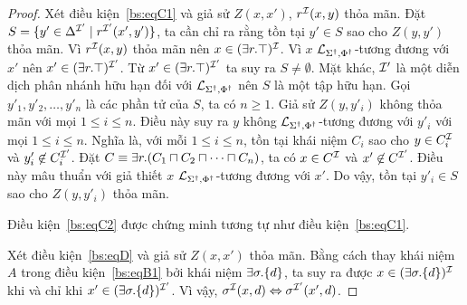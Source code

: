 \begin{proof}
	\semiItem Xét điều kiện~\eqref{bs:eqC1} và giả sử $Z(x,x')$, $r^{\mathcal{I}}(x,y)$ thỏa mãn. Đặt $S = \{y' \in \Delta^{\mathcal{I}'} \mid r^{\mathcal{I}'}(x',y')\}$, ta cần chỉ ra rằng tồn tại $y' \in S$ sao cho $Z(y,y')$ thỏa mãn. Vì $r^{\mathcal{I}}(x,y)$ thỏa mãn nên $x \in (\exists r.\top)^{\mathcal{I}}$. Vì $x$ $\mathcal{L}_{\Sigma^\dag,\Phi^\dag}$-tương đương với $x'$ nên $x' \in (\exists r.\top)^{\mathcal{I}'}$. Từ $x' \in (\exists r.\top)^{\mathcal{I}'}$ ta suy ra $S \not= \emptyset$. Mặt khác, $\mathcal{I}'$ là một diễn dịch phân nhánh hữu hạn đối với $\mathcal{L}_{\Sigma^\dag,\Phi^\dag}$ nên $S$ là một tập hữu hạn. Gọi $y'_1, y'_2, \ldots, y'_n$ là các phần tử của $S$, ta có $n \geq 1$.
	Giả sử $Z(y,y'_i)$ không thỏa mãn với mọi $1 \leq i \leq n$. Điều này suy ra $y$ không $\mathcal{L}_{\Sigma^\dag,\Phi^\dag}$-tương đương với $y'_i$ với mọi $1 \leq i \leq n$. Nghĩa là, với mỗi $1 \leq i \leq n$, tồn tại khái niệm $C_i$ sao cho $y \in C_i^{\mathcal{I}}$ và $y'_i \not\in C_i^{\mathcal{I}'}$. Đặt $C \equiv \exists r.(C_1 \sqcap C_2 \sqcap \cdots \sqcap C_n)$, ta có $x \in C^{\mathcal{I}}$ và $x' \not\in C^{\mathcal{I}'}$. Điều này mâu thuẩn với giả thiết $x$ $\mathcal{L}_{\Sigma^\dag,\Phi^\dag}$-tương đương với $x'$. Do vậy, tồn tại $y'_i \in S$ sao cho $Z(y, y'_i)$ thỏa mãn.
	
	\semiItem Điều kiện~\eqref{bs:eqC2} được chứng minh tương tự như điều kiện~\eqref{bs:eqC1}.
	
	\semiItem{}Xét điều kiện~\eqref{bs:eqD} và giả sử $Z(x,x')$ thỏa mãn. Bằng cách thay khái niệm $A$ trong điều kiện~\eqref{bs:eqB1} bởi khái niệm $\exists \sigma.\{d\}$, ta suy ra được $x \in (\exists \sigma.\{d\})^{\mathcal{I}}$ khi và chỉ khi $x' \in (\exists \sigma.\{d\})^{\mathcal{I}'}$. Vì vậy, $\sigma^{\mathcal{I}}(x,d) \Leftrightarrow \sigma^{\mathcal{I}'}(x',d)$.
%		
	

\end{proof}
